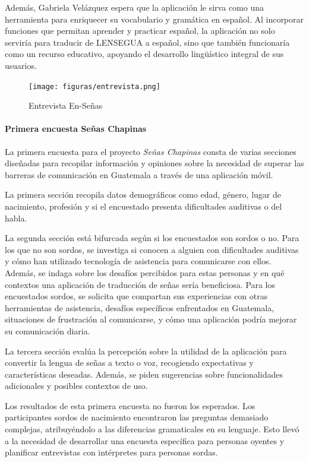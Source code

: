 Además, Gabriela Velázquez espera que la aplicación le sirva como una herramienta para enriquecer su vocabulario y gramática en español. Al incorporar funciones que permitan aprender y practicar español, la aplicación no solo serviría para traducir de LENSEGUA a español, sino que también funcionaría como un recurso educativo, apoyando el desarrollo lingüístico integral de sus usuarios.


\begin{figure} [H]
    \centering
    \texttt{[image: figuras/entrevista.png]}
    \caption{Entrevista En-Señas}
    \label{fig:enter-label}
\end{figure}

\paragraph{Primera encuesta Señas Chapinas}

La primera encuesta para el proyecto \textit{Señas Chapinas} consta de varias secciones diseñadas para recopilar información y opiniones sobre la necesidad de superar las barreras de comunicación en Guatemala a través de una aplicación móvil.

La primera sección recopila datos demográficos como edad, género, lugar de nacimiento, profesión y si el encuestado presenta dificultades auditivas o del habla.

La segunda sección está bifurcada según si los encuestados son sordos o no. Para los que no son sordos, se investiga si conocen a alguien con dificultades auditivas y cómo han utilizado tecnología de asistencia para comunicarse con ellos. Además, se indaga sobre los desafíos percibidos para estas personas y en qué contextos una aplicación de traducción de señas sería beneficiosa. Para los encuestados sordos, se solicita que compartan sus experiencias con otras herramientas de asistencia, desafíos específicos enfrentados en Guatemala, situaciones de frustración al comunicarse, y cómo una aplicación podría mejorar su comunicación diaria.

La tercera sección evalúa la percepción sobre la utilidad de la aplicación para convertir la lengua de señas a texto o voz, recogiendo expectativas y características deseadas. Además, se piden sugerencias sobre funcionalidades adicionales y posibles contextos de uso.

Los resultados de esta primera encuesta no fueron los esperados. Los participantes sordos de nacimiento encontraron las preguntas demasiado complejas, atribuyéndolo a las diferencias gramaticales en su lenguaje. Esto llevó a la necesidad de desarrollar una encuesta específica para personas oyentes y planificar entrevistas con intérpretes para personas sordas.


